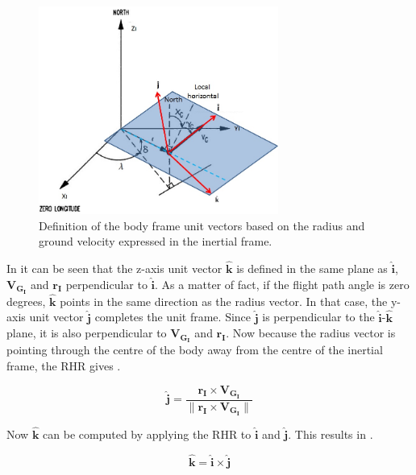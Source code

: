 \begin{figure}[!ht]
\centering
\includegraphics[width=0.7\textwidth]{figures/reference_frames/cartesian_transformation_mooij1994motion.jpg}
\caption{Definition of the body frame unit vectors based on the radius and ground velocity expressed in the inertial frame.}
\label{fig:cartesian_transformation_mooij1994motion}
\end{figure}

In  it can be seen that the z-axis unit vector $\mathbf{\hat{k}}$ is defined in the same plane as $\mathbf{\hat{i}}$, $\mathbf{V_{G_{I}}}$ and $\mathbf{r_{I}}$ perpendicular to $\mathbf{\hat{i}}$. As a matter of fact, if the flight path angle is zero degrees, $\mathbf{\hat{k}}$ points in the same direction as the radius vector. In that case, the y-axis unit vector $\mathbf{\hat{j}}$ completes the unit frame. Since $\mathbf{\hat{j}}$ is perpendicular to the $\mathbf{\hat{i}}$-$\mathbf{\hat{k}}$ plane, it is also perpendicular to $\mathbf{V_{G_{I}}}$ and $\mathbf{r_{I}}$. Now because the radius vector is pointing through the centre of the body away from the centre of the inertial frame, the \ac{RHR} gives .


\begin{equation} \label{eq:jHat}
\mathbf{\hat{j}} = \dfrac{\mathbf{r_{I} \times \mathbf{V_{G_{I}}}}}{\| \mathbf{r_{I} \times \mathbf{V_{G_{I}}}} \|}
\end{equation}

Now $\mathbf{\hat{k}}$ can be computed by applying the \ac{RHR} to $\mathbf{\hat{i}}$ and $\mathbf{\hat{j}}$. This results in .

\begin{equation} \label{eq:kHat}
\mathbf{\hat{k}} = \mathbf{\hat{i}} \times \mathbf{\hat{j}}
\end{equation}

